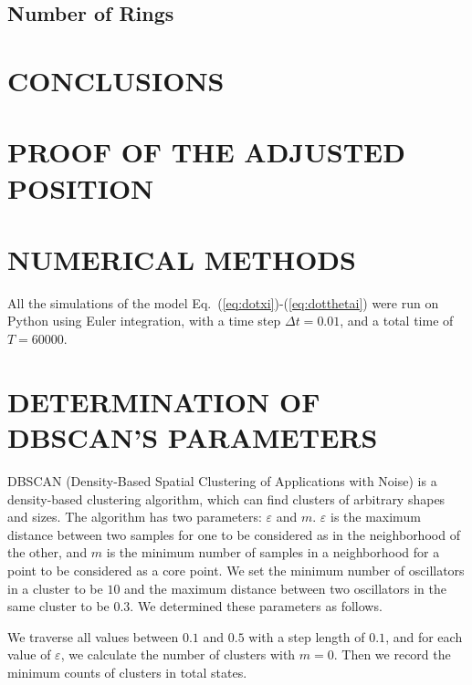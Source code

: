 \documentclass[%
 aip,
 amsmath,amssymb,
 reprint,%
]{revtex4-1}
\begin{document}
\subsection{Number of Rings \label{sec:numRings}}

\section{CONCLUSIONS}

\appendix

\section{\label{sec:adj_pos} PROOF OF THE ADJUSTED POSITION}


\section{\label{sec:numerics} NUMERICAL METHODS}

All the simulations of the model Eq.~(\ref{eq:dotxi})-(\ref{eq:dotthetai}) were run on Python using Euler integration, with a time step $\Delta t=0.01$, and a total time of $T=60000$. 


\section{\label{sec:DBSCAN_param} DETERMINATION OF DBSCAN'S PARAMETERS}

DBSCAN (Density-Based Spatial Clustering of Applications with Noise) is a density-based clustering algorithm, which can find clusters of arbitrary shapes and sizes. The algorithm has two parameters: $\varepsilon$ and $m$. $\varepsilon$ is the maximum distance between two samples for one to be considered as in the neighborhood of the other, and $m$ is the minimum number of samples in a neighborhood for a point to be considered as a core point. We set the minimum number of oscillators in a cluster to be $10$ and the maximum distance between two oscillators in the same cluster to be $0.3$. We determined these parameters as follows. 

We traverse all values between $0.1$ and $0.5$ with a step length of $0.1$, and for each value of $\varepsilon$, we calculate the number of clusters with $m=0$. Then we record the minimum counts of clusters in total states. 
\end{document}
